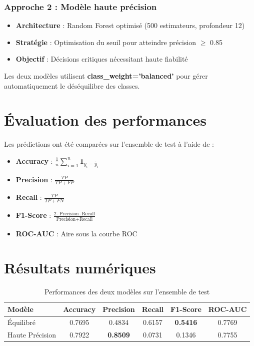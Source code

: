 \documentclass[11pt,a4paper]{article}
\begin{document}
\subsubsection{Approche 2 : Modèle haute précision}
\begin{itemize}
    \item \textbf{Architecture} : Random Forest optimisé (500 estimateurs, profondeur 12)
    \item \textbf{Stratégie} : Optimisation du seuil pour atteindre précision $\geq$ 0.85
    \item \textbf{Objectif} : Décisions critiques nécessitant haute fiabilité
\end{itemize}

Les deux modèles utilisent \textbf{class\_weight='balanced'} pour gérer automatiquement le déséquilibre des classes.

\section{Évaluation des performances}

Les prédictions ont été comparées sur l'ensemble de test à l'aide de :
\begin{itemize}
    \item \textbf{Accuracy} : $\frac{1}{n}\sum_{i=1}^{n} \mathbf{1}_{y_i = \hat{y}_i}$
    \item \textbf{Precision} : $\frac{TP}{TP + FP}$
    \item \textbf{Recall} : $\frac{TP}{TP + FN}$
    \item \textbf{F1-Score} : $\frac{2 \cdot \text{Precision} \cdot \text{Recall}}{\text{Precision} + \text{Recall}}$
    \item \textbf{ROC-AUC} : Aire sous la courbe ROC
\end{itemize}

\section{Résultats numériques}

\begin{table}[H]
\centering
\begin{tabular}{@{}lccccc@{}}
\toprule
\textbf{Modèle} & \textbf{Accuracy} & \textbf{Precision} & \textbf{Recall} & \textbf{F1-Score} & \textbf{ROC-AUC} \\
\midrule
Équilibré & 0.7695 & 0.4834 & 0.6157 & \textbf{0.5416} & 0.7769 \\
Haute Précision & 0.7922 & \textbf{0.8509} & 0.0731 & 0.1346 & 0.7755 \\
\bottomrule
\end{tabular}
\caption{Performances des deux modèles sur l'ensemble de test}
\label{tab:results}
\end{table}
\end{document}
